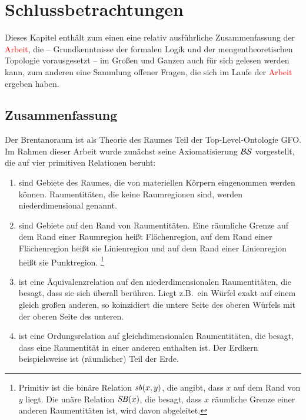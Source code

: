 \chapter{Schlussbetrachtungen}\label{chap:diskussion}
    Dieses Kapitel enthält zum einen eine relativ ausführliche Zusammenfassung der \textcolor{red}{Arbeit}, die -- Grundkenntnisse der formalen Logik und der mengentheoretischen Topologie vorausgesetzt -- im Großen und Ganzen auch für sich gelesen werden kann,
    zum anderen eine Sammlung offener Fragen, die sich im Laufe der \textcolor{red}{Arbeit} ergeben haben.
    
    
    \section{Zusammenfassung}
    Der
    Brentanoraum ist als Theorie des Raumes Teil der Top-Level-Ontologie GFO.
    Im Rahmen dieser Arbeit wurde zunächst seine Axiomatisierung $\mathcal{BS}$ vorgestellt,
    die auf vier primitiven Relationen beruht:
    \begin{enumerate}
        \item {} 
            sind Gebiete des Raumes, die von materiellen Körpern eingenommen werden können.
            Raumentitäten, die keine Raumregionen sind, werden niederdimensional genannt.
        \item {} 
            sind Gebiete auf den Rand von Raumentitäten. 
            Eine räumliche Grenze auf dem Rand einer Raumregion heißt Flächenregion, auf dem Rand einer Flächenregion heißt sie Linienregion und auf dem Rand einer Linienregion heißt sie Punktregion.%
            \footnote{
                Primitiv ist die binäre Relation $\mathit{sb}(x,y)$, die angibt, dass $x$ auf dem Rand von $y$ liegt.
                Die unäre Relation $\mathit{S\hspace*{-0.25ex}B}(x)$, die besagt, dass $x$ räumliche Grenze einer anderen Raumentitäten ist, wird davon abgeleitet.
            }
        \item {}
            ist eine Äquivalenzrelation auf den niederdimensionalen Raumentitäten, die besagt, dass sie sich überall berühren.
            Liegt z.B.\ ein Würfel exakt auf einem gleich großen anderen, so koinzidiert die untere Seite des oberen Würfels mit der oberen Seite des unteren.
        \item {}
            ist eine Ordungsrelation auf gleichdimensionalen Raumentitäten, die besagt, dass eine Raumentität in einer anderen enthalten ist.
            Der Erdkern beispielsweise ist (räumlicher) Teil der Erde.
    \end{enumerate}

